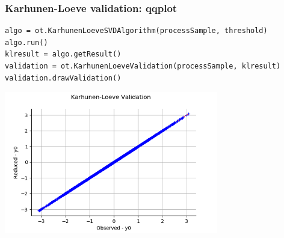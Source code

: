 \documentclass{beamer}
\begin{document}
\begin{frame}[containsverbatim]
\frametitle{Karhunen-Loeve validation: qqplot}
% 
% 
\begin{lstlisting}
algo = ot.KarhunenLoeveSVDAlgorithm(processSample, threshold)
algo.run()
klresult = algo.getResult()
validation = ot.KarhunenLoeveValidation(processSample, klresult)
validation.drawValidation()
\end{lstlisting}
% 
\begin{center}
\includegraphics[width=0.7\textwidth]{figures/kl0.png}
\end{center}
\end{frame}
\end{document}
